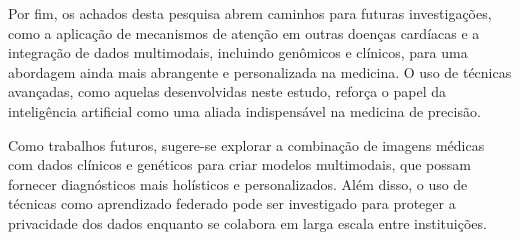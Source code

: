 Por fim, os achados desta pesquisa abrem caminhos para futuras investigações, como a aplicação de mecanismos de atenção em outras doenças cardíacas e a integração de dados multimodais, incluindo genômicos e clínicos, para uma abordagem ainda mais abrangente e personalizada na medicina. O uso de técnicas avançadas, como aquelas desenvolvidas neste estudo, reforça o papel da inteligência artificial como uma aliada indispensável na medicina de precisão.

Como trabalhos futuros, sugere-se explorar a combinação de imagens médicas com dados clínicos e genéticos para criar modelos multimodais, que possam fornecer diagnósticos mais holísticos e personalizados. Além disso, o uso de técnicas como aprendizado federado pode ser investigado para proteger a privacidade dos dados enquanto se colabora em larga escala entre instituições.


